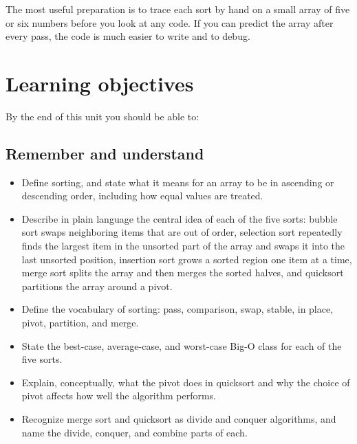 \documentclass[11pt]{article}
\begin{document}
The most useful preparation is to trace each sort by hand on a small array of five or six
numbers before you look at any code. If you can predict the array after every pass, the code
is much easier to write and to debug.

\section{Learning objectives}

By the end of this unit you should be able to:

\subsection*{Remember and understand}
\begin{itemize}[leftmargin=1.4em]
  \item Define sorting, and state what it means for an array to be in ascending or
    descending order, including how equal values are treated.
  \item Describe in plain language the central idea of each of the five sorts: bubble sort
    swaps neighboring items that are out of order, selection sort repeatedly finds the
    largest item in the unsorted part of the array and swaps it into the last unsorted
    position, insertion sort grows a sorted region one item at a time, merge
    sort splits the array and then merges the sorted halves, and quicksort partitions the
    array around a pivot.
  \item Define the vocabulary of sorting: pass, comparison, swap, stable, in place, pivot,
    partition, and merge.
  \item State the best-case, average-case, and worst-case Big-O class for each of the five
    sorts.
  \item Explain, conceptually, what the pivot does in quicksort and why the choice of pivot
    affects how well the algorithm performs.
  \item Recognize merge sort and quicksort as divide and conquer algorithms, and name the
    divide, conquer, and combine parts of each.
\end{itemize}
\end{document}
